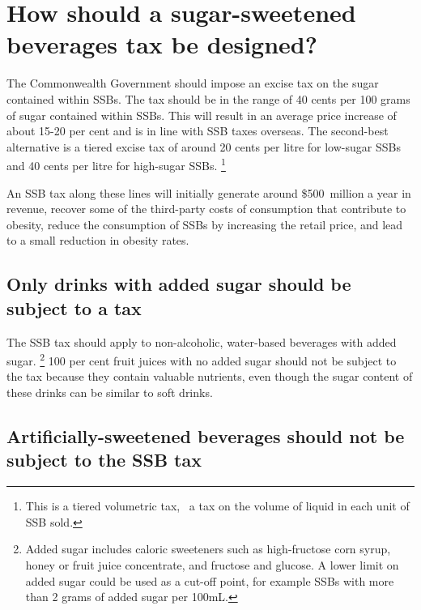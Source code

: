 \documentclass[embargoed]{grattan}
\begin{document}
\chapter{How should a sugar-sweetened beverages tax be designed?}\label{how-should-a-sugar-sweetened-beverages-tax-be-designed}

The Commonwealth Government should impose an excise tax on the sugar contained within SSBs.
The tax should be in the range of 40 cents per 100 grams of sugar contained within SSBs.
This will result in an average price increase of about 15-20 per cent and is in line with SSB taxes overseas.
The second-best alternative is a tiered excise tax of around 20 cents per litre for low-sugar SSBs and 40 cents per litre for high-sugar SSBs.%
\footnote{This is a tiered volumetric tax, \ie~a tax on the volume of liquid in each unit of SSB sold.}

An SSB tax along these lines will initially generate around \$500~million a year in revenue, recover some of the third-party costs of consumption that contribute to obesity, reduce the consumption of SSBs by increasing the retail price, and lead to a small reduction in obesity rates.

\section{Only drinks with added sugar should be subject to a tax}\label{only-drinks-with-added-sugar-should-be-subject-to-a-tax}

The SSB tax should apply to non-alcoholic, water-based beverages with added sugar.%
\footnote{Added sugar includes caloric sweeteners such as high-fructose corn syrup, honey or fruit juice concentrate, and fructose and glucose.
A lower limit on added sugar could be used as a cut-off point, for example SSBs with more than 2 grams of added sugar per 100mL.} 100 per cent fruit juices with no added sugar should not be subject to the tax because they contain valuable nutrients, even though the sugar content of these drinks can be similar to soft drinks.

\section{Artificially-sweetened beverages should not be subject to the SSB tax}\label{artificially-sweetened-beverages-should-not-be-subject-to-the-ssb-tax}
\end{document}
